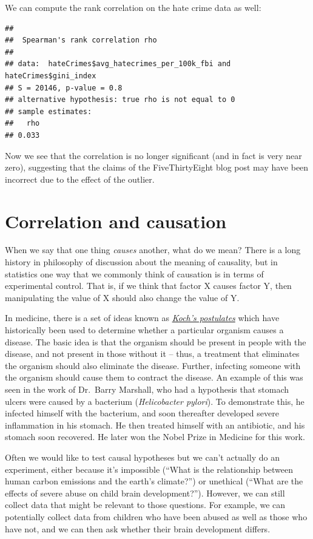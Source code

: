 \documentclass[12pt,]{book}
\theoremstyle{definition}
\theoremstyle{definition}
\theoremstyle{definition}
\theoremstyle{remark}
\begin{document}
We can compute the rank correlation on the hate crime data as well:

\begin{verbatim}
## 
##  Spearman's rank correlation rho
## 
## data:  hateCrimes$avg_hatecrimes_per_100k_fbi and hateCrimes$gini_index
## S = 20146, p-value = 0.8
## alternative hypothesis: true rho is not equal to 0
## sample estimates:
##   rho 
## 0.033
\end{verbatim}

Now we see that the correlation is no longer significant (and in fact is very near zero), suggesting that the claims of the FiveThirtyEight blog post may have been incorrect due to the effect of the outlier.

\hypertarget{correlation-and-causation}{%
\section{Correlation and causation}\label{correlation-and-causation}}

When we say that one thing \emph{causes} another, what do we mean? There is a long history in philosophy of discussion about the meaning of causality, but in statistics one way that we commonly think of causation is in terms of experimental control. That is, if we think that factor X causes factor Y, then manipulating the value of X should also change the value of Y.

In medicine, there is a set of ideas known as \href{https://en.wikipedia.org/wiki/Koch\%27s_postulates}{\emph{Koch's postulates}} which have historically been used to determine whether a particular organism causes a disease. The basic idea is that the organism should be present in people with the disease, and not present in those without it -- thus, a treatment that eliminates the organism should also eliminate the disease. Further, infecting someone with the organism should cause them to contract the disease. An example of this was seen in the work of Dr.~Barry Marshall, who had a hypothesis that stomach ulcers were caused by a bacterium (\emph{Helicobacter pylori}). To demonstrate this, he infected himself with the bacterium, and soon thereafter developed severe inflammation in his stomach. He then treated himself with an antibiotic, and his stomach soon recovered. He later won the Nobel Prize in Medicine for this work.

Often we would like to test causal hypotheses but we can't actually do an experiment, either because it's impossible (``What is the relationship between human carbon emissions and the earth's climate?'') or unethical (``What are the effects of severe abuse on child brain development?''). However, we can still collect data that might be relevant to those questions. For example, we can potentially collect data from children who have been abused as well as those who have not, and we can then ask whether their brain development differs.
\end{document}
